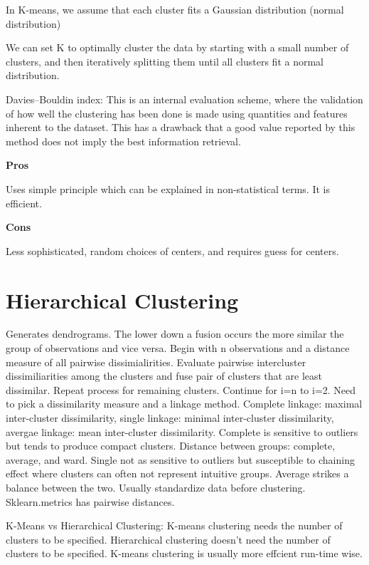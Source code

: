 \documentclass[]{book}
\begin{document}
In K-means, we assume that each cluster fits a Gaussian distribution
(normal distribution)

We can set K to optimally cluster the data by starting with a small
number of clusters, and then iteratively splitting them until all
clusters fit a normal distribution.

Davies--Bouldin index: This is an internal evaluation scheme, where the
validation of how well the clustering has been done is made using
quantities and features inherent to the dataset. This has a drawback
that a good value reported by this method does not imply the best
information retrieval.

\textbf{Pros}

Uses simple principle which can be explained in non-statistical terms.
It is efficient.

\textbf{Cons}

Less sophisticated, random choices of centers, and requires guess for
centers.

\section{Hierarchical Clustering}\label{hierarchical-clustering}

Generates dendrograms. The lower down a fusion occurs the more similar
the group of observations and vice versa. Begin with n observations and
a distance measure of all pairwise dissimialirities. Evaluate pairwise
intercluster dissimiliarities among the clusters and fuse pair of
clusters that are least dissimilar. Repeat process for remaining
clusters. Continue for i=n to i=2. Need to pick a dissimilarity measure
and a linkage method. Complete linkage: maximal inter-cluster
dissimilarity, single linkage: minimal inter-cluster dissimilarity,
avergae linkage: mean inter-cluster dissimilarity. Complete is sensitive
to outliers but tends to produce compact clusters. Distance between
groups: complete, average, and ward. Single not as sensitive to outliers
but susceptible to chaining effect where clusters can often not
represent intuitive groups. Average strikes a balance between the two.
Usually standardize data before clustering. Sklearn.metrics has pairwise
distances.

K-Means vs Hierarchical Clustering: K-means clustering needs the number
of clusters to be speciﬁed. Hierarchical clustering doesn't need the
number of clusters to be speciﬁed. K-means clustering is usually more
effcient run-time wise.
\end{document}
